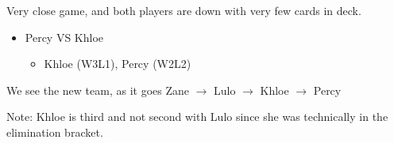 \documentclass[12pt, letterpaper]{article}
\begin{document}
\par \noindent Very close game, and both players are down with very few cards in deck.

\begin{itemize}
   \item Percy VS Khloe
   \begin{itemize}
      \item Khloe (W3L1), Percy (W2L2)
   \end{itemize}
\end{itemize}
        
\par We see the new team, as it goes Zane $\rightarrow$ Lulo $\rightarrow$ Khloe $\rightarrow$ Percy

\par Note: Khloe is third and not second with Lulo since she was technically in the elimination bracket.
\end{document}
